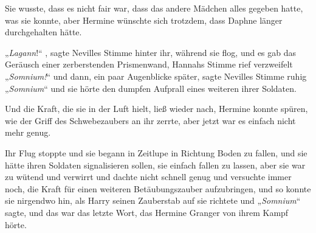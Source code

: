 Sie wusste, dass es nicht fair war, dass das andere Mädchen alles gegeben hatte, was sie konnte, aber Hermine wünschte sich trotzdem, dass Daphne länger durchgehalten hätte.

„\emph{Lagann}!“ , sagte Nevilles Stimme hinter ihr, während sie flog, und es gab das Geräusch einer zerberstenden Prismenwand, Hannahs Stimme rief verzweifelt „\emph{Somnium!}“ und dann, ein paar Augenblicke später, sagte Nevilles Stimme ruhig „\emph{Somnium}“ und sie hörte den dumpfen Aufprall eines weiteren ihrer Soldaten.

Und die Kraft, die sie in der Luft hielt, ließ wieder nach, Hermine konnte spüren, wie der Griff des Schwebezaubers an ihr zerrte, aber jetzt war es einfach nicht mehr genug.

Ihr Flug stoppte und sie begann in Zeitlupe in Richtung Boden zu fallen, und sie hätte ihren Soldaten signalisieren sollen, sie einfach fallen zu lassen, aber sie war zu wütend und verwirrt und dachte nicht schnell genug und versuchte immer noch, die Kraft für einen weiteren Betäubungszauber aufzubringen, und so konnte sie nirgendwo hin, als Harry seinen Zauberstab auf sie richtete und „\emph{Somnium}“ sagte, und das war das letzte Wort, das Hermine Granger von ihrem Kampf hörte.

